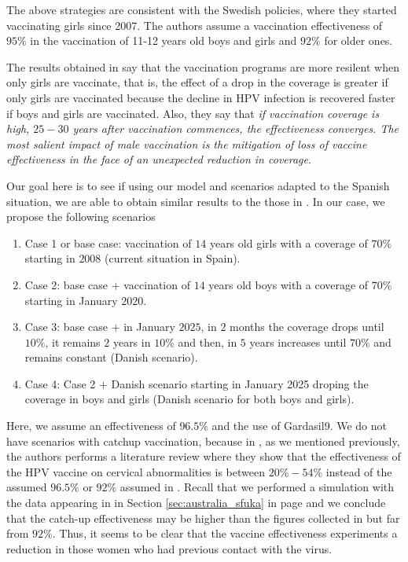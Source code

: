 The above strategies are consistent with the Swedish policies, where they started vaccinating girls since 2007. The authors assume a vaccination effectiveness of $95\%$ in the vaccination of 11-12 years old boys and girls and $92\%$ for older ones.

The results obtained in \cite{Elfstrm2015} say that the vaccination programs are more resilent when only girls are vaccinate, that is, the effect of a drop in the coverage is greater if only girls are vaccinated because the decline in HPV infection is recovered faster if boys and girls are vaccinated. Also, they say that \textit{if vaccination coverage is high, $25-30$ years after vaccination commences, the effectiveness converges. The most salient impact of male vaccination is the mitigation of loss of vaccine effectiveness in the face of an unexpected reduction in coverage}.

Our goal here is to see if using our model and scenarios adapted to the Spanish situation, we are able to obtain similar results to the those in \cite{Elfstrm2015}. In our case, we propose the following scenarios

\begin{enumerate}
	\item Case 1 or base case: vaccination of $14$ years old girls with a coverage of $70\%$ starting in $2008$ (current situation in Spain).
	\item Case 2: base case $+$ vaccination of $14$ years old boys with a coverage of $70\%$ starting in January $2020$.
	\item Case 3: base case $+$ in January $2025$, in $2$ months the coverage drops until $10\%$, it remains $2$ years in $10\%$ and then, in $5$ years increases until $70\%$ and remains constant (Danish scenario).
	\item Case 4: Case 2 $+$ Danish scenario starting in January 2025 droping the coverage in boys and girls (Danish scenario for both boys and girls).
\end{enumerate}

Here, we assume an effectiveness of $96.5\%$ and the use of Gardasil9. We do not have scenarios with catchup vaccination, because in \cite{Skufca}, as we mentioned previously, the authors performs a literature review where they show that the effectiveness of the HPV vaccine on cervical abnormalities is between $20\% − 54\%$ instead of the assumed $96.5\%$ or $92\%$ assumed in \cite{Elfstrm2015}. Recall that we performed a simulation with the data appearing in \cite{Skufca} in Section \ref{sec:australia_sfuka} in page \pageref{sec:australia_sfuka} and we conclude that the catch-up effectiveness may be higher than the figures collected in \cite{Skufca} but far from $92\%$. Thus, it seems to be clear that the vaccine effectiveness experiments a reduction in those women who had previous contact with the virus.

